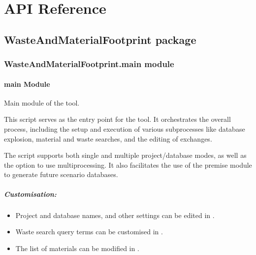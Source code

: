 \documentclass[letterpaper,10pt,english]{sphinxmanual}
\begin{document}
\sphinxstepscope


\chapter{API Reference}
\label{\detokenize{modules:api-reference}}\label{\detokenize{modules::doc}}
\sphinxstepscope


\section{WasteAndMaterialFootprint package}
\label{\detokenize{WasteAndMaterialFootprint:wasteandmaterialfootprint-package}}\label{\detokenize{WasteAndMaterialFootprint::doc}}

\subsection{WasteAndMaterialFootprint.main module}
\label{\detokenize{WasteAndMaterialFootprint:module-WasteAndMaterialFootprint.main}}\label{\detokenize{WasteAndMaterialFootprint:wasteandmaterialfootprint-main-module}}

\subsubsection{main Module}
\label{\detokenize{WasteAndMaterialFootprint:main-module}}
\sphinxAtStartPar
Main module of the  tool.

\sphinxAtStartPar
This script serves as the entry point for the  tool. It orchestrates the overall process, including the setup and execution of various subprocesses like database explosion, material and waste searches, and the editing of exchanges.

\sphinxAtStartPar
The script supports both single and multiple project/database modes, as well as the option to use multiprocessing. It also facilitates the use of the premise module to generate future scenario databases.


\paragraph{Customisation:}
\label{\detokenize{WasteAndMaterialFootprint:customisation}}\begin{itemize}
\item {} 
\sphinxAtStartPar
Project and database names, and other settings can be edited in .

\item {} 
\sphinxAtStartPar
Waste search query terms can be customised in .

\item {} 
\sphinxAtStartPar
The list of materials can be modified in .

\end{itemize}
\end{document}
